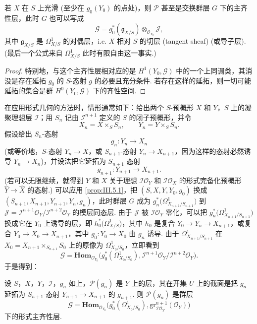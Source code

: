 \begin{corollary}\label{cor:III.5.2}
若 $X$ 在 $S$ 上光滑 (至少在 $g_0(Y_0)$ 的点处)，则 $\mathcal{P}$ 甚至是交换群层 $G$ 下的主齐性层，此时 $G$ 也可以写成
\[
\mathcal{G} = g_0^{*}(\mathfrak{g}_{X/S}) \otimes_{\mathcal{O}_{Y_0}} \mathcal{J},
\]
其中 $\mathfrak{g}_{X/S}$ 是 $\varOmega_{X/S}^{1}$ 的对偶层，i.e. $X$ 相对 $S$ 的切层 (tangent sheaf) (或导子层). (最后一个公式来自 $\varOmega_{X/S}^{1}$ 此时有限自由这一事实.)
\end{corollary}

\begin{proof}
特别地，与这个主齐性层相对应的是 $H^1(Y_0, \mathcal{G})$ 中的一个上同调类，其消没是存在延拓 $g_0$ 的 $S$-态射 $g$ 的必要且充分条件. 若存在这样的延拓，则一切可能延拓的集合是群 $H^0(Y_0, \mathcal{G})$ 下的齐性空间.
\end{proof}

在应用形式几何的方法时，情形通常如下：给出两个 $S$-预概形 $X$ 和 $Y$，$S$ 上的凝聚理想层 $\mathcal{I}$；用 $S_n$ 记由 $\mathcal{I}^{n+1}$ 定义的 $S$ 的闭子预概形，并令
\[
X_n = X \times_S S_n, \qquad Y_n = Y \times_S S_n.
\]
假设给出 $S_n$-态射
\[
g_n \colon Y_n \longrightarrow X_n
\]
(或等价地，$S$-态射 $Y_n \to X$，或 $S_{n+1}$-态射 $Y_n \to X_{n+1}$，因为这样的态射必然诱导 $Y_n \to X_n$)，并设法把它延拓为 $S_{n+1}$-态射
\[
g_{n+1} \colon Y_{n+1} \longrightarrow X_{n+1}.
\]
(若可以无限继续，就得到 $Y$ 和 $X$ 关于理想 $\mathcal{I}\mathcal{O}_Y$ 和 $\mathcal{I}\mathcal{O}_X$ 的形式完备化预概形 $\widehat{Y} \to \widehat{X}$ 的态射.) 可以应用 \ref{prop:III.5.1}，把 $(S, X, Y, Y_0, g_0)$ 换成 $(S_{n+1}, X_{n+1}, Y_{n+1}, Y_n, g_n)$，此时群层 $G$ 成为 $g_n^{*}\bigl(\varOmega_{X_{n+1}/S_{n+1}}^{1}\bigr)$ 到 $\mathcal{J} = \mathcal{I}^{n+1}\mathcal{O}_Y/\mathcal{I}^{n+2}\mathcal{O}_Y$ 的模层同态层. 由于 $\mathcal{J}$ 被 $\mathcal{I}\mathcal{O}_Y$ 零化，可以把 $g_n^{*}\bigl(\varOmega_{X_{n+1}/S_{n+1}}^{1}\bigr)$ 换成它在 $Y_0$ 上诱导的层，即 $h_0^{*}\bigl(\varOmega_{X/S}^{1}\bigr)$，其中 $h_0$ 是复合 $Y_0 \to Y_n \to X_{n+1}$，或复合 $Y_0 \to X_0 \to X_{n+1}$，其中 $g_0 \colon Y_0 \to X_0$ 由 $g_n$ 诱导. 由于 $\varOmega_{X_{n+1}/S_{n+1}}^{1}$ 在 $X_0 = X_{n+1} \times_{S_{n+1}} S_0$ 上的原像为 $\varOmega_{X_0/S_0}^{1}$，立即看到
\[
\mathcal{G} = \mathbf{Hom}_{\mathcal{O}_{Y_0}}\bigl(g_0^{*}(\varOmega_{X_0/S_0}^{1}), \mathcal{I}^{n+1}\mathcal{O}_Y/\mathcal{I}^{n+2}\mathcal{O}_Y\bigr).
\]
于是得到：

\begin{corollary}\label{cor:III.5.3}
设 $S$，$X$，$Y$，$\mathcal{I}$，$g_n$ 如上，$\mathcal{P}(g_n)$ 是 $Y$ 上的层，其在开集 $U$ 上的截面是把 $g_n$ 延拓为 $S_{n+1}$-态射 $Y_{n+1} \to X_{n+1}$ 的 $g_{n+1}$. 则 $\mathcal{P}(g_n)$ 是群层
\[
\mathcal{G} = \mathbf{Hom}_{\mathcal{O}_{Y_0}}\bigl(g_0^{*}(\varOmega_{X_0/S_0}^{1}), \mathrm{gr}_{\mathcal{I}\mathcal{O}_Y}^{n+1}(\mathcal{O}_Y)\bigr)
\]
下的形式主齐性层.
\end{corollary}

